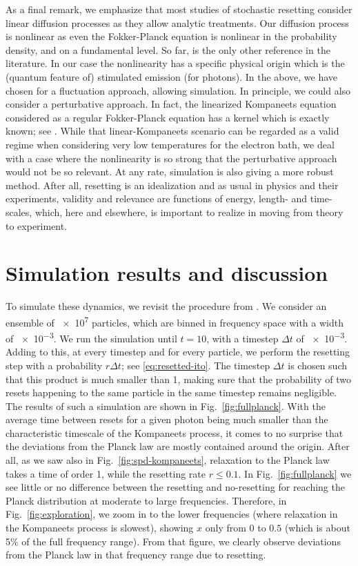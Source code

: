 \documentclass[a4paper,12pt,reqno,superscriptaddress,nofootinbib]{revtex4}
\theoremstyle{plain}
\theoremstyle{definition}
\theoremstyle{remark}
\newcommand{\0}{^{(0)}}
\newcommand{\1}{^{(1)}}
\newcommand{\2}{^{(2)}}
\begin{document}
As a final remark, we emphasize that most studies of stochastic resetting consider linear diffusion processes as they allow analytic treatments. Our diffusion process is nonlinear  as even the Fokker-Planck equation is nonlinear in the probability density, and on a fundamental level.  So far, \cite{przem} is the only other reference in the literature. In our case the nonlinearity has a specific physical origin which is the (quantum feature of) stimulated emission (for photons).   In the above, we have chosen for a fluctuation approach, allowing simulation.  In principle, we could also consider a perturbative approach.  In fact, the linearized Kompaneets equation considered as a regular Fokker-Planck equation has a kernel which is exactly known; see \cite{nagirner}. While that linear-Kompaneets scenario can be regarded as a valid regime when considering very low temperatures for the electron bath, we deal with a case where the nonlinearity is so strong that the perturbative approach would not be so relevant.  At any rate, simulation is also giving a more robust method.  After all,  resetting is an idealization  and as usual in physics and their experiments, validity and relevance are functions of energy, length- and time-scales, which, here and elsewhere, is important to realize in moving from theory to experiment.

\section{Simulation results and discussion}\label{sim}

To simulate these dynamics, we revisit the procedure from \cite{paper2}. We consider an ensemble of \num{e7} particles, which are binned in frequency space with a width of \num{e-3}. We run the simulation until $t = 10$, with a timestep $\Delta t$ of \num{e-3}. Adding to this, at every timestep and for every particle, we perform the resetting step with a probability $r \Delta t$; see \eqref{eq:resetted-ito}. The timestep $\Delta t$ is chosen such  that this product is much smaller than 1, making sure that the probability of two resets happening to the same particle in the same timestep remains negligible.\\

The results of such a simulation are shown in Fig.~\ref{fig:fullplanck}. With the average time between resets for a given photon being much smaller than the characteristic timescale of the Kompaneets process, it comes to no surprise that the deviations from the Planck law are mostly contained around the origin. After all, as we saw also in Fig.~\ref{fig:spd-kompaneets}, relaxation to the Planck law takes a time of order 1, while the resetting rate $r\leq 0.1$. In Fig.~\ref{fig:fullplanck} we see little or no difference between the resetting and no-resetting for reaching the Planck distribution at moderate to large frequencies. Therefore, in Fig.~\ref{fig:exploration}, we zoom in to the lower frequencies (where relaxation in the Kompaneets process is slowest), showing $x$ only from $0$ to $0.5$ (which is about 5\% of the full frequency range). From that figure, we clearly observe deviations from the Planck law in that frequency range due to resetting.\\
\end{document}
